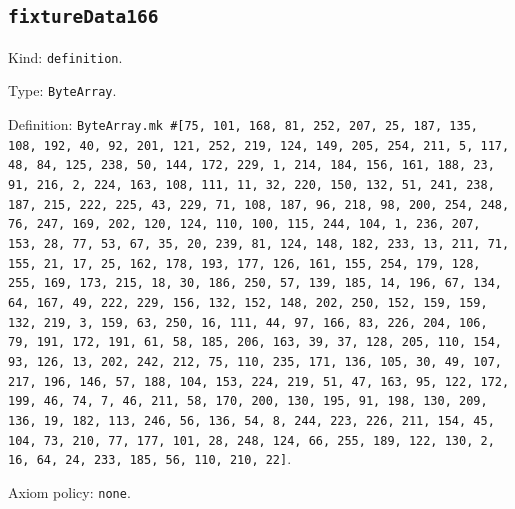 \documentclass[11pt]{article}
\begin{document}
\subsection*{\texttt{fixtureData166}}
\noindent Kind: \texttt{definition}.\par
\noindent Type: \texttt{ByteArray}.\par
\noindent Definition: \texttt{ByteArray.mk \#[75, 101, 168, 81, 252, 207, 25, 187, 135, 108, 192, 40, 92, 201, 121, 252, 219, 124, 149, 205, 254, 211, 5, 117, 48, 84, 125, 238, 50, 144, 172, 229, 1, 214, 184, 156, 161, 188, 23, 91, 216, 2, 224, 163, 108, 111, 11, 32, 220, 150, 132, 51, 241, 238, 187, 215, 222, 225, 43, 229, 71, 108, 187, 96, 218, 98, 200, 254, 248, 76, 247, 169, 202, 120, 124, 110, 100, 115, 244, 104, 1, 236, 207, 153, 28, 77, 53, 67, 35, 20, 239, 81, 124, 148, 182, 233, 13, 211, 71, 155, 21, 17, 25, 162, 178, 193, 177, 126, 161, 155, 254, 179, 128, 255, 169, 173, 215, 18, 30, 186, 250, 57, 139, 185, 14, 196, 67, 134, 64, 167, 49, 222, 229, 156, 132, 152, 148, 202, 250, 152, 159, 159, 132, 219, 3, 159, 63, 250, 16, 111, 44, 97, 166, 83, 226, 204, 106, 79, 191, 172, 191, 61, 58, 185, 206, 163, 39, 37, 128, 205, 110, 154, 93, 126, 13, 202, 242, 212, 75, 110, 235, 171, 136, 105, 30, 49, 107, 217, 196, 146, 57, 188, 104, 153, 224, 219, 51, 47, 163, 95, 122, 172, 199, 46, 74, 7, 46, 211, 58, 170, 200, 130, 195, 91, 198, 130, 209, 136, 19, 182, 113, 246, 56, 136, 54, 8, 244, 223, 226, 211, 154, 45, 104, 73, 210, 77, 177, 101, 28, 248, 124, 66, 255, 189, 122, 130, 2, 16, 64, 24, 233, 185, 56, 110, 210, 22]}.\par
\noindent Axiom policy: \texttt{none}.\par
\end{document}
